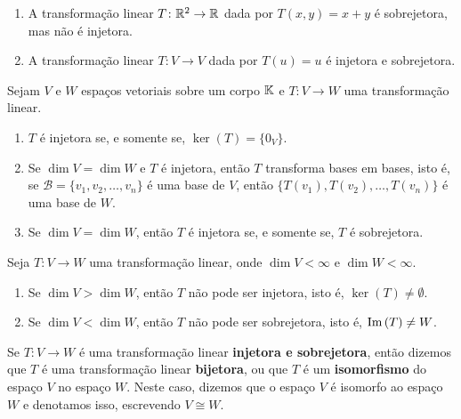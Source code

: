 \begin{exemplos}
  \begin{enumerate}[label={\arabic*})]
    \item A transformação linear $T \colon \mathbb{R}^2 \to \mathbb{R}$ dada por $T(x,y) = x + y$ é sobrejetora, mas não é injetora.

    \item A transformação linear $T \colon V \to V$ dada por $T(u) = u$ é injetora e sobrejetora.
  \end{enumerate}
\end{exemplos}

\begin{proposicao}\label{caracteriza_transformacao_injetora}
  Sejam $V$ e $W$ espaços vetoriais sobre um corpo $\mathbb{K}$ e $T \colon V \to W$ uma transformação linear.
    \begin{enumerate}[label={\roman*})]
      \item $T$ é injetora se, e somente se, $\ker(T) = \{0_V\}$.

      \item Se $\dim V = \dim W$ e $T$ é injetora, então $T$ transforma bases em bases, isto é, se $\mathcal{B} = \{v_1, v_2, \dots, v_n\}$ é uma base de $V$, então $\{T(v_1), T(v_2), \dots, T(v_n)\}$ é uma base de $W$.

      \item Se $\dim V = \dim W$, então $T$ é injetora se, e somente se, $T$ é sobrejetora.
    \end{enumerate}
\end{proposicao}

\begin{observacoes}
  Seja $T \colon V \to W$ uma transformação linear, onde $\dim V < \infty$ e $\dim W < \infty$.
  \begin{enumerate}[label={\roman*})]
    \item Se $\dim V > \dim W$, então $T$ não pode ser injetora, isto é, $\ker(T) \ne \emptyset$.

    \item Se $\dim V < \dim W$, então $T$ não pode ser sobrejetora, isto é, ${\rm Im\,}(T) \ne W$.
  \end{enumerate}
\end{observacoes}

\begin{definicao}
  Se $T \colon V \to W$ é uma transformação linear \textbf{injetora e sobrejetora}, então dizemos que $T$ é uma transformação linear \textbf{bijetora}, ou que $T$ é um \textbf{isomorfismo} do espaço $V$ no espaço $W$. Neste caso, dizemos que o espaço $V$ é isomorfo ao espaço $W$ e denotamos isso, escrevendo $V \cong W$.
\end{definicao}


